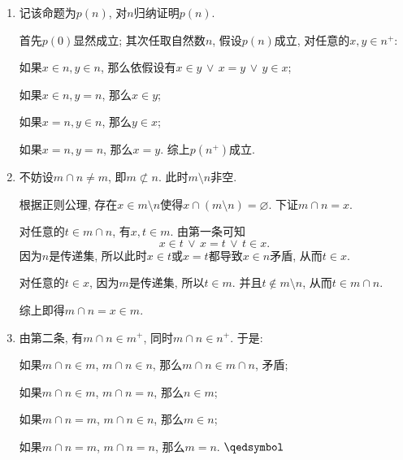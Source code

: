\documentclass[UTF8]{ctexart}
\begin{document}

\begin{enumerate}
    \item 记该命题为$p(n)$, 对$n$归纳证明$p(n)$.
    
    \hspace{2.17em}
    首先$p(0)$显然成立; 其次任取自然数$n$, 假设$p(n)$成立, 对任意的$x,y\in n^+$:

    \hspace{2.17em}
    如果$x\in n,y\in n$, 那么依假设有$x\in y\,\lor\,x=y\,\lor\,y\in x$;

    \hspace{2.17em}
    如果$x\in n,y=n$, 那么$x\in y$;
    
    \hspace{2.17em}
    如果$x=n,y\in n$, 那么$y\in x$;
    
    \hspace{2.17em}
    如果$x=n,y=n$, 那么$x=y$. 综上$p(n^+)$成立.

    \item 不妨设$m\cap n\neq m$, 即$m\not\subset n$. 此时$m\setminus n$非空.

    \hspace{2.17em}
    根据正则公理, 存在$x\in m\setminus n$使得$x\cap(m\setminus n)=\varnothing$.
    下证$m\cap n=x$.

    \hspace{2.17em}
    对任意的$t\in m\cap n$, 有$x,t\in m$. 由第一条可知
    \[
        x\in t\,\lor\,x=t\,\lor\,t\in x.
    \]
    因为$n$是传递集, 所以此时$x\in t$或$x=t$都导致$x\in n$矛盾, 从而$t\in x$.

    \hspace{2.17em}
    对任意的$t\in x$, 因为$m$是传递集, 所以$t\in m$.
    并且$t\notin m\setminus n$, 从而$t\in m\cap n$.

    \hspace{2.17em}
    综上即得$m\cap n=x\in m$.


    \item 由第二条, 有$m\cap n\in m^+$, 同时$m\cap n\in n^+$. 于是:
    
    \hspace{2.17em}
    如果$m\cap n\in m$, $m\cap n\in n$, 那么$m\cap n\in m\cap n$, 矛盾;

    \hspace{2.17em}
    如果$m\cap n\in m$, $m\cap n=n$, 那么$n\in m$;
    
    \hspace{2.17em}
    如果$m\cap n=m$, $m\cap n\in n$, 那么$m\in n$;
    
    \hspace{2.17em}
    如果$m\cap n=m$, $m\cap n=n$, 那么$m=n$. \hfill $\qedsymbol$

\end{enumerate}
\end{document}
